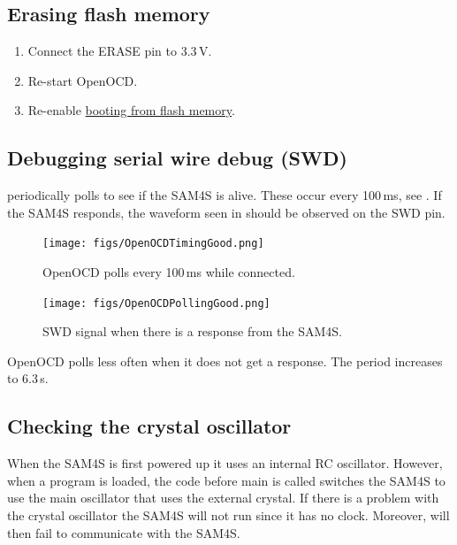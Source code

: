 \subsection{Erasing flash memory}
\label{erasing-flash-memory}

\begin{enumerate}
\item Connect the ERASE pin to 3.3\,V.

\item Re-start OpenOCD.  

\item Re-enable \hyperref[booting-from-flash-memory]{booting from
  flash memory}.
\end{enumerate}


\subsection{Debugging serial wire debug (SWD)}
\label{debugging-serial-wire-debug-swd}

 periodically polls to see if the SAM4S is alive.
These occur every 100\,ms, see .  If the SAM4S
responds, the waveform seen in  should be
observed on the SWD pin.

\begin{figure}
\centering
\texttt{[image: figs/OpenOCDTimingGood.png]}
\caption{OpenOCD polls every 100\,ms while connected.}
\label{fig:openocd-poll}
\end{figure}

\begin{figure}
\centering
\texttt{[image: figs/OpenOCDPollingGood.png]}
\caption{SWD signal when there is a response from the SAM4S.}
\label{fig:openocd-response}
\end{figure}



OpenOCD polls less often when it does not get a response. The period
increases to 6.3\,s.

\subsection{Checking the crystal oscillator}
\label{checking-the-crystal-oscillator}

When the SAM4S is first powered up it uses an internal RC oscillator.
However, when a program is loaded, the code before main is called
switches the SAM4S to use the main oscillator that uses the external
crystal.  If there is a problem with the crystal oscillator the SAM4S
will not run since it has no clock.  Moreover,  will
then fail to communicate with the SAM4S.

